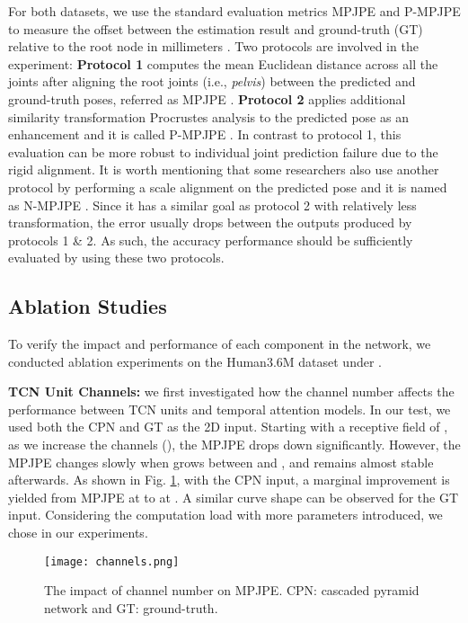 \documentclass[twocolumn]{svjour3}          \smartqed  \usepackage{graphicx}
\begin{document}
For both datasets, we use the standard evaluation metrics MPJPE and P-MPJPE to measure the offset between the estimation result and ground-truth (GT) relative to the root node in millimeters \citep{Ionescu2014}. Two protocols are involved in the experiment: {\bf Protocol 1}  computes the mean Euclidean distance across all the joints after aligning the root joints (i.e., \emph{pelvis}) between the predicted and ground-truth poses, referred as MPJPE \citep{fang2018, lee2018, Pavlakos2017, luvizon20182d}.  {\bf Protocol 2} applies additional similarity transformation Procrustes analysis \citep{lepetit2005monocular} to the predicted pose as an enhancement and it is called P-MPJPE \citep{Martinez2017, Hossain2018, Yang2018, Pavllo2019}. In contrast to protocol 1, this evaluation can be more robust to individual joint prediction failure due to the rigid alignment. It is worth mentioning that some researchers also use another protocol by performing a scale alignment on the predicted pose and it is named as N-MPJPE \citep{rhodin2018learning}. Since it has a similar goal as protocol 2 with relatively less transformation, the error usually drops between the outputs produced by protocols 1 \& 2. As such, the accuracy performance should be sufficiently evaluated by using these two protocols.

\subsection{Ablation Studies}\label{ablation_study}
To verify the impact and performance of each component in the network, we conducted ablation experiments on the Human3.6M dataset under . 

{\bf TCN Unit Channels: } we first investigated how the channel number  affects the performance between TCN units and temporal attention models. In our test, we used both the CPN and GT as the 2D input. Starting with a receptive field of , as we increase the channels (), the MPJPE drops down significantly. However, the MPJPE changes slowly when  grows between  and , and remains almost stable afterwards. As shown in Fig. \ref{channels}, with the CPN input, a marginal improvement is yielded from MPJPE  at  to  at . A similar curve shape can be observed for the GT input. Considering the computation load with more parameters introduced, we chose  in our experiments.


\begin{figure}[ht]
\begin{center}
   \texttt{[image: channels.png]}
\end{center}
   \caption{The impact of channel number on MPJPE. CPN: cascaded pyramid network and GT: ground-truth.}\label{channels}
\end{figure}
\end{document}
